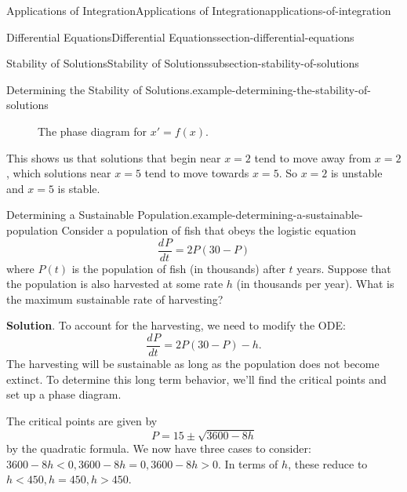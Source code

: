 \documentclass[oneside,10pt,]{book}
\numberwithin{equation}{section}
\newcommand{\dv}[3][]{\dfrac{d^{#1} #2}{d #3^{#1}}}
\newcommand{\lt}{<}
\newcommand{\gt}{>}
\begin{document}
\begin{chapterptx}{Applications of Integration}{}{Applications of Integration}{}{}{applications-of-integration}
\begin{sectionptx}{Differential Equations}{}{Differential Equations}{}{}{section-differential-equations}
\begin{subsectionptx}{Stability of Solutions}{}{Stability of Solutions}{}{}{subsection-stability-of-solutions}
\begin{example}{Determining the Stability of Solutions.}{example-determining-the-stability-of-solutions}
\begin{figure}
{
}
\caption{The phase diagram for \(x' = f(x).\)\label{figure-21}}
\end{figure}
\hypertarget{p-759}{}%
This shows us that solutions that begin near \(x = 2\) tend to move away from \(x = 2\), which solutions near \(x = 5\) tend to move towards \(x = 5\). So \(x = 2\) is unstable and \(x = 5\) is stable.%
\end{example}
\begin{example}{Determining a Sustainable Population.}{example-determining-a-sustainable-population}%
\hypertarget{p-760}{}%
Consider a population of fish that obeys the logistic equation%
\begin{equation*}
\dv{P}{t} = 2P(30 - P)
\end{equation*}
where \(P(t)\) is the population of fish (in thousands) after \(t\) years. Suppose that the population is also harvested at some rate \(h\) (in thousands per year). What is the maximum sustainable rate of harvesting?%
\par\smallskip%
\noindent\textbf{Solution}.\hypertarget{solution-160}{}\quad%
\hypertarget{p-761}{}%
To account for the harvesting, we need to modify the ODE:%
\begin{equation*}
\dv{P}{t} = 2P(30 - P) - h.
\end{equation*}
The harvesting will be sustainable as long as the population does not become extinct. To determine this long term behavior, we'll find the critical points and set up a phase diagram.%
\par
\hypertarget{p-762}{}%
The critical points are given by%
\begin{equation*}
P = 15 \pm \sqrt{3600 - 8h}
\end{equation*}
by the quadratic formula. We now have three cases to consider: \(3600 - 8h \lt 0, 3600 - 8h = 0, 3600 - 8h \gt 0.\) In terms of \(h\), these reduce to \(h \lt 450, h = 450, h \gt 450\).%

\end{example}
\end{subsectionptx}
\end{sectionptx}
\end{chapterptx}
\end{document}
